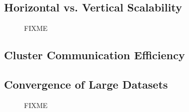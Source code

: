 \subsection{Horizontal vs. Vertical Scalability}
\begin{figure}[t] %
  \centering
  \caption{FIXME}
  \label{fig-scale-up}
\end{figure}

\subsection{Cluster Communication Efficiency}

\subsection{Convergence of Large Datasets}
\begin{figure*}[t] %
  \centering
  \caption{FIXME}
  \label{fig-ppx}
\end{figure*}

